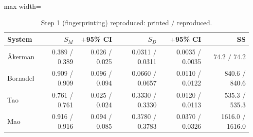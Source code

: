\begin{table}[t]
\centering
\caption{Step 1 (fingerprinting) reproduced: printed / reproduced.}\label{tab:reprofp}
\footnotesize
\begin{adjustbox}{max width=\linewidth}
\begin{tabular}{lrrrrr}
\toprule
System & $S_M$ & $\pm$95\% CI & $S_D$ & $\pm$95\% CI & SS \\
\midrule
Åkerman & 0.389 / 0.389 & 0.026 / 0.025 & 0.0311 / 0.0311 & 0.0035 / 0.0035 & 74.2 / 74.2 \\
Bornadel & 0.909 / 0.909 & 0.096 / 0.094 & 0.0660 / 0.0657 & 0.0110 / 0.0122 & 840.6 / 840.6 \\
Tao & 0.761 / 0.761 & 0.025 / 0.024 & 0.3330 / 0.3330 & 0.0120 / 0.0113 & 535.3 / 535.3 \\
Mao & 0.916 / 0.916 & 0.094 / 0.085 & 0.3780 / 0.3783 & 0.0370 / 0.0326 & 1616.0 / 1616.0 \\
\bottomrule
\end{tabular}
\end{adjustbox}
\end{table}
